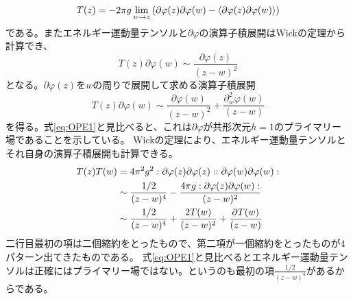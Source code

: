 \documentclass[11pt, aps, longbibliography]{article}
\numberwithin{equation}{section}
\begin{document}
        \begin{equation}\label{eq:free-boson8}
            T(z) = -2\pi g \lim_{w\rightarrow z} \left( \partial\varphi(z) \partial\varphi(w) - \expval{\partial \varphi(z)\partial\varphi(w)} \right)
        \end{equation}
        である。またエネルギー運動量テンソルと$\partial \varphi$の演算子積展開はWickの定理から計算でき、
        \begin{equation}\label{eq:free-boson9}
            T(z)\partial \varphi(w) \sim \frac{\partial \varphi(z)}{(z-w)^2}
        \end{equation}
        となる。$\partial \varphi(z)$を$w$の周りで展開して求める演算子積展開
        \begin{equation}\label{eq:free-boson10}
            T(z)\partial \varphi(w) \sim \frac{\partial \varphi(w)}{(z-w)^2} + \frac{\partial^2_w \varphi(w)}{(z-w)}
        \end{equation}
        を得る。式\eqref{eq:OPE1}と見比べると、これは$\partial \varphi$が共形次元$h=1$のプライマリー場であることを示している。
        Wickの定理により、エネルギー運動量テンソルとそれ自身の演算子積展開も計算できる。
        \begin{align}
            T(z)T(w) &= 4\pi^2 g^2 :\partial \varphi(z)\partial \varphi(z)::\partial \varphi(w) \partial \varphi(w): \notag \\
            &\sim \frac{1/2}{(z-w)^4}-\frac{4\pi g:\partial \varphi(z)\partial \varphi(w):}{(z-w)^2} \notag \\
            &\sim \frac{1/2}{(z-w)^4} + \frac{2T(w)}{(z-w)^2} + \frac{\partial T(w)}{(z-w)}
        \end{align}
        二行目最初の項は二個縮約をとったもので、第二項が一個縮約をとったものが4パターン出てきたものである。
        式\eqref{eq:OPE1}と見比べるとエネルギー運動量テンソルは正確にはプライマリー場ではない。というのも最初の項$\frac{1/2}{(z-w)^4}$があるからである。
\end{document}
